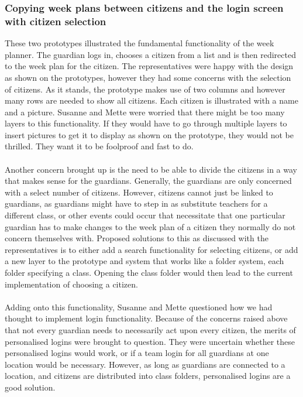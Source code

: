 \subsubsection{Copying week plans between citizens and the login screen with citizen selection}
These two prototypes illustrated the fundamental functionality of the week planner.
The guardian logs in, chooses a citizen from a list and is then redirected to the week plan for the citizen.
The representatives were happy with the design as shown on the prototypes, however they had some concerns with the selection of citizens.
As it stands, the prototype makes use of two columns and however many rows are needed to show all citizens.
Each citizen is illustrated with a name and a picture.
Susanne and Mette were worried that there might be too many layers to this functionality.
If they would have to go through multiple layers to insert pictures to get it to display as shown on the prototype, they would not be thrilled.
They want it to be foolproof and fast to do.
\\\\
Another concern brought up is the need to be able to divide the citizens in a way that makes sense for the guardians.
Generally, the guardians are only concerned with a select number of citizens.
However, citizens cannot just be linked to guardians, as guardians might have to step in as substitute teachers for a different class, or other events could occur that necessitate that one particular guardian has to make changes to the week plan of a citizen they normally do not concern themselves with.
Proposed solutions to this as discussed with the representatives is to either add a search functionality for selecting citizens, or add a new layer to the prototype and system that works like a folder system, each folder specifying a class.
Opening the class folder would then lead to the current implementation of choosing a citizen.
\\\\
Adding onto this functionality, Susanne and Mette questioned how we had thought to implement login functionality.
Because of the concerns raised above that not every guardian needs to necessarily act upon every citizen, the merits of personalised logins were brought to question.
They were uncertain whether these personalised logins would work, or if a team login for all guardians at one location would be necessary.
However, as long as guardians are connected to a location, and citizens are distributed into class folders, personalised logins are a good solution.
